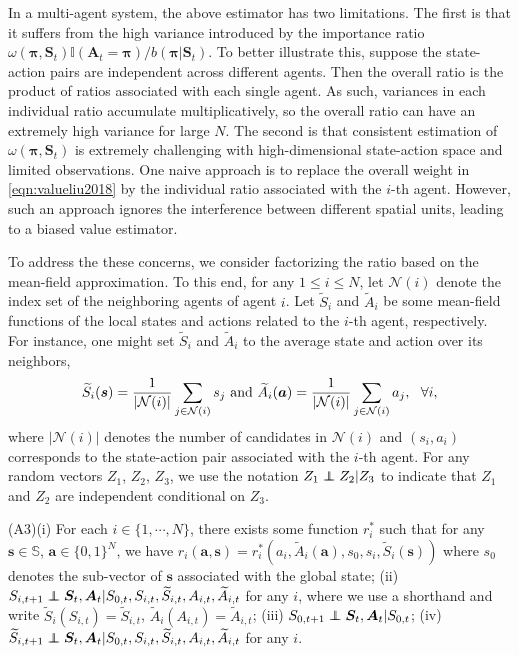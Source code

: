 \documentclass{article}
\newcommand\independent{\protect\mathpalette{\protect\independenT}{\perp}}
\def\independenT#1#2{\mathrel{\rlap{$#1#2$}\mkern2mu{#1#2}}}
\begin{document}
In a multi-agent system, the above estimator has two limitations. The first is that it suffers from the high variance introduced by the importance ratio $\omega(\bm{\pi}, \bm{S}_{t}) \mathbb{I}(\bm{A}_t=\bm{\pi})/b(\bm{\pi}|\bm{S}_t)$. To better illustrate this, suppose the state-action pairs are independent across different agents. Then the overall ratio is the product of ratios associated with each single agent. As such, variances in each individual ratio accumulate multiplicatively, so the overall ratio can have an extremely high variance for large $N$. The second is that consistent estimation of $\omega(\bm{\pi}, \bm{S}_{t})$ is extremely challenging with high-dimensional state-action space and limited observations. One naive approach is to replace the overall weight in \eqref{eqn:valueliu2018} by the individual ratio associated with the $i$-th agent. However, such an approach ignores the interference between different spatial units, leading to a biased value estimator. 

To address the these concerns, we consider factorizing the ratio based on the mean-field approximation. To this end, for any $1\le i\le N$, let $\mathcal{N}(i)$ denote the index set of the neighboring agents of agent $i$. Let $\widetilde{S}_{i}$ and $\widetilde{A}_i$ be some mean-field functions of the local states and actions related to the $i$-th agent, respectively. For instance, one might set $\widetilde{S}_i$ and $\widetilde{A}_i$ to the average state and action over its neighbors,
\vspace*{-0.1cm}
\begin{eqnarray*}
	\widetilde{S}_i(\bm{s})=\frac{1}{|\mathcal{N}(i)|}\sum_{j\in \mathcal{N}(i)} s_j\,\,\hbox{and}\,\,\widetilde{A}_i(\bm{a})=\frac{1}{|\mathcal{N}(i)|}\sum_{j\in \mathcal{N}(i)} a_j,\,\,\,\,\forall i,
\end{eqnarray*}
where $|\mathcal{N}(i)|$ denotes the number of candidates in $\mathcal{N}(i)$ and $(s_i,a_i)$ corresponds to the state-action pair associated with the $i$-th agent. For any random vectors $Z_1$, $Z_2$, $Z_3$, we use the notation $Z_1\independent Z_2|Z_3$ to indicate that $Z_1$ and $Z_2$ are independent conditional on $Z_3$.

(A3)(i) For each $i\in \{1,\cdots,N\}$, there exists some function $r_i^*$ such that for any $\bm{s}\in \mathbb{S}$, $\bm{a}\in \{0,1\}^{N}$, we have $r_i(\bm{a},\bm{s})=r_i^*(a_i,\widetilde{A}_i(\bm{a}),s_0,s_i,\widetilde{S}_i(\bm{s}))$ where $s_0$ denotes the sub-vector of $\bm{s}$ associated with the global state; (ii) $S_{i,t+1}\independent \bm{S}_t,\bm{A}_t|S_{0,t},S_{i,t},\widetilde{S}_{i,t},A_{i,t},\widetilde{A}_{i,t}$ for any $i$, where we use a shorthand and write $\widetilde{S}_i(S_{i,t})=\widetilde{S}_{i,t}$, $\widetilde{A}_i(A_{i,t})=\widetilde{A}_{i,t}$; (iii) $S_{0,t+1}\independent \bm{S}_t,\bm{A}_t|S_{0,t}$; (iv) $\widetilde{S}_{i,t+1}\independent \bm{S}_t,\bm{A}_t|S_{0,t},S_{i,t},\widetilde{S}_{i,t},A_{i,t},\widetilde{A}_{i,t}$ for any $i$.
\end{document}
